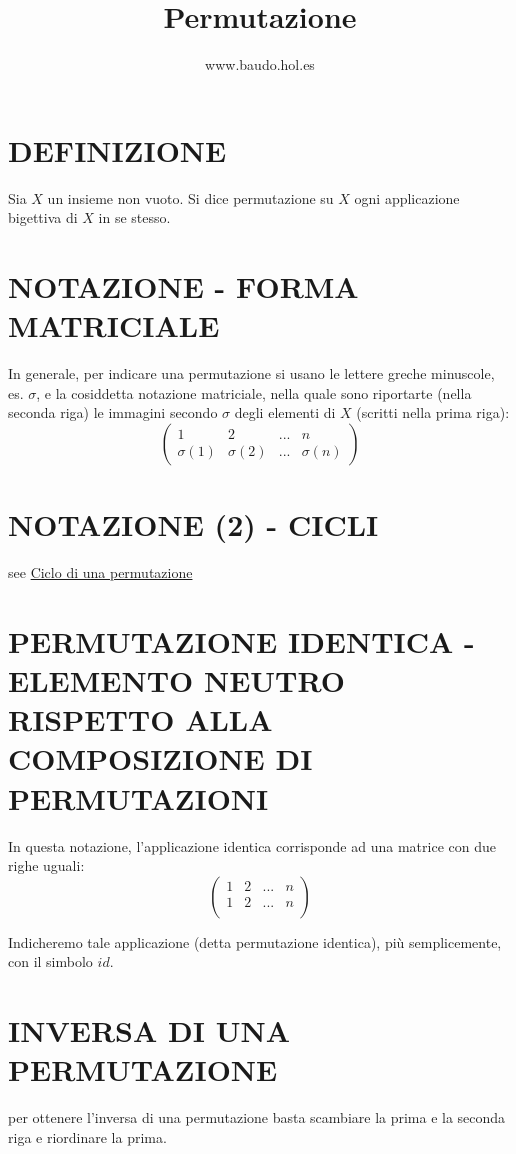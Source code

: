 \documentclass[a4paper,10pt]{article}
\title{Permutazione}
\author{www.baudo.hol.es}
\begin{document}
\maketitle

\section{DEFINIZIONE}
Sia $X$ un insieme non vuoto. Si dice permutazione su $X$ ogni applicazione bigettiva di $X$ in se stesso. \cite{permutazione1}

\section{NOTAZIONE - FORMA MATRICIALE}
In generale, per indicare una permutazione si usano le lettere greche minuscole, es. $\sigma$, e la cosiddetta notazione matriciale,
nella quale sono riportarte (nella seconda riga) le immagini secondo $\sigma$ degli elementi di $X$ (scritti nella prima riga):
\[
\left(
 \begin{array}{cccc}
  1 & 2 & ... & n \\
  \sigma(1) & \sigma(2) & ... & \sigma(n)
 \end{array}
\right)
\] \cite{permutazione1}

\section{NOTAZIONE (2) - CICLI}
see \href{./PermutazioneCicli.html}{Ciclo di una permutazione}

\section{PERMUTAZIONE IDENTICA - ELEMENTO NEUTRO RISPETTO ALLA COMPOSIZIONE DI PERMUTAZIONI}
In questa notazione, l'applicazione identica corrisponde ad una matrice con due righe uguali:
\[
\left(
 \begin{array}{cccc}
  1 & 2 & ... & n \\
  1 & 2 & ... & n \\
 \end{array}
\right)
\]

Indicheremo tale applicazione (detta permutazione identica), più semplicemente, con il simbolo $id$. \cite{permutazione1}

\section{INVERSA DI UNA PERMUTAZIONE}
per ottenere l’inversa di una permutazione basta scambiare la prima e la seconda riga e riordinare la prima. \cite{permutazione2}
\end{document}
